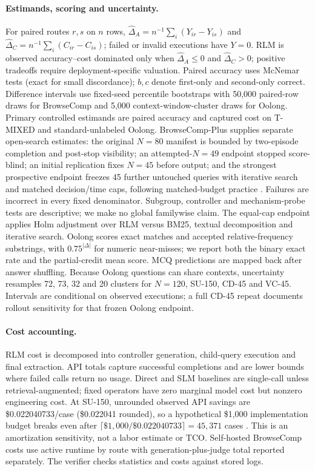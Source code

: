 \documentclass[letterpaper]{article}
\begin{document}
\paragraph{Estimands, scoring and uncertainty.}
For paired routes $r,s$ on $n$ rows, $\widehat{\Delta}_A=n^{-1}\sum_i(Y_{ir}-Y_{is})$ and $\widehat{\Delta}_C=n^{-1}\sum_i(C_{ir}-C_{is})$; failed or invalid executions have $Y=0$. RLM is observed accuracy--cost dominated only when $\widehat{\Delta}_A\leq0$ and $\widehat{\Delta}_C>0$; positive tradeoffs require deployment-specific valuation. Paired accuracy uses McNemar tests (exact for small discordance); $b,c$ denote first-only and second-only correct. Difference intervals use fixed-seed percentile bootstraps with 50,000 paired-row draws for BrowseComp and 5,000 context-window-cluster draws for Oolong. Primary controlled estimands are paired accuracy and captured cost on T-MIXED and standard-unlabeled Oolong. BrowseComp-Plus supplies separate open-search estimates: the original $N{=}80$ manifest is bounded by two-episode completion and post-stop visibility; an attempted-$N{=}49$ endpoint stopped score-blind; an initial replication fixes $N{=}45$ before output; and the strongest prospective endpoint freezes 45 further untouched queries with iterative search and matched decision/time caps, following matched-budget practice \citep{srlm2026}. Failures are incorrect in every fixed denominator. Subgroup, controller and mechanism-probe tests are descriptive; we make no global familywise claim. The equal-cap endpoint applies Holm adjustment over RLM versus BM25, textual decomposition and iterative search. Oolong scores exact matches and accepted relative-frequency substrings, with $0.75^{|\Delta|}$ for numeric near-misses; we report both the binary exact rate and the partial-credit mean score. MCQ predictions are mapped back after answer shuffling. Because Oolong questions can share contexts, uncertainty resamples 72, 73, 32 and 20 clusters for $N{=}120$, SU-150, CD-45 and VC-45. Intervals are conditional on observed executions; a full CD-45 repeat documents rollout sensitivity for that frozen Oolong endpoint.

\paragraph{Cost accounting.}
RLM cost is decomposed into controller generation, child-query execution and final extraction. API totals capture successful completions and are lower bounds where failed calls return no usage. Direct and SLM baselines are single-call unless retrieval-augmented; fixed operators have zero marginal model cost but nonzero engineering cost. At SU-150, unrounded observed API savings are \$0.022040733/case (\$0.022041 rounded), so a hypothetical \$1,000 implementation budget breaks even after $\lceil \$1{,}000/\$0.022040733\rceil=45{,}371$ cases \citep{kapoor2024agentsmatter}. This is an amortization sensitivity, not a labor estimate or TCO. Self-hosted BrowseComp costs use active runtime by route with generation-plus-judge total reported separately. The verifier checks statistics and costs against stored logs.
\end{document}
